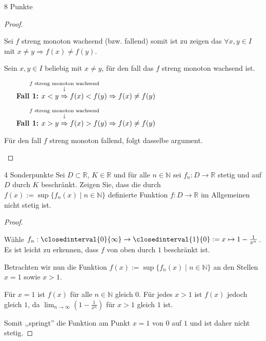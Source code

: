 \documentclass{problemset}
\begin{document}
\begin{problem}{8 Punkte}
\begin{proof}
\begin{itemize}
              Sei $f$ streng monoton wachsend (bzw. fallend) somit ist zu
              zeigen das $\forall x, y \in I$ mit $x \neq y \Rightarrow f(x)
              \ne f(y)$.

              Sein $x,y \in I$ beliebig mit $x \ne y$, für den fall das $f$
              streng monoton wachsend ist.

              \begin{itemize}
                  \item [\textbf{Fall 1:}] $x < y \annotated{$f$ streng monoton wachsend}{\Rightarrow} f(x) < f(y) \Rightarrow f(x) \ne f(y)$ \checkmark
                  \item [\textbf{Fall 1:}] $x > y \annotated{$f$ streng monoton wachsend}{\Rightarrow} f(x) > f(y) \Rightarrow f(x) \ne f(y)$ \checkmark
              \end{itemize}

              Für den fall $f$ streng monoton fallend, folgt dasselbe argument.
    \end{itemize}
\end{proof}
\end{problem}

\begin{problem}{4 Sonderpunkte}
Sei $D \subset \mathbb{R}$, $K \in \mathbb{R}$ und für alle $n \in \mathbb{N}$ sei $f_n : D \to \mathbb{R}$ stetig und auf $D$ durch $K$ beschränkt. Zeigen Sie, dass die durch $f(x) := \sup\{f_n(x) \mid n \in \mathbb{N}\}$ definierte Funktion $f : D \to \mathbb{R}$ im Allgemeinen nicht stetig ist.
\begin{proof}
    $ $

    Wähle $f_n: \closedinterval{0}{\infty} \rightarrow \closedinterval{1}{0} :=
    x \mapsto 1 - \frac{1}{x^n}$. Es ist leicht zu erkennen, dass $f$ von oben
    durch $1$ beschränkt ist.

    Betrachten wir nun die Funktion $f(x) := \sup\{f_n(x) \mid n \in
    \mathbb{N}\}$ an den Stellen $x = 1$ sowie $x > 1$.

    Für $x = 1$ ist $f(x)$ für alle $n \in \mathbb{N}$ gleich $0$. Für jedes $x
    > 1$ ist $f(x)$ jedoch gleich $1$, da $\lim_{{n \to \infty}} (1 -
    \frac{1}{x^n})$ für $x > 1$ gleich $1$ ist.

    Somit ,,springt'' die Funktion am Punkt $x = 1$ von $0$ auf $1$ und ist
    daher nicht stetig.
\end{proof}
\end{problem}
\end{document}
